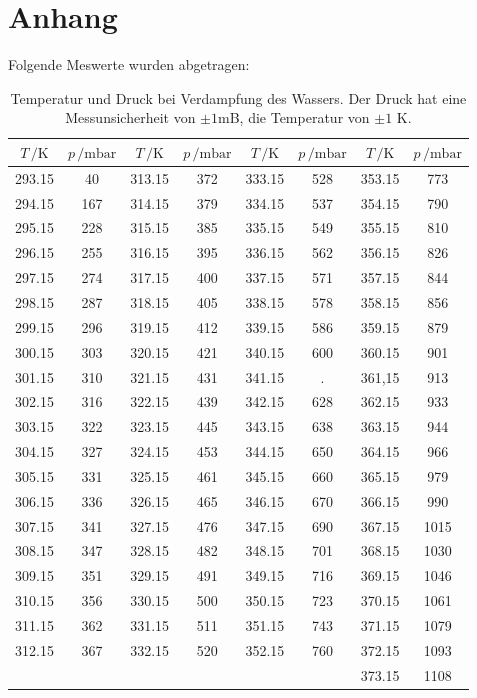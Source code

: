 \newpage
\section*{Anhang}
Folgende Meswerte wurden abgetragen:
\begin{table}[H]
    \centering
    \caption{Temperatur und Druck bei Verdampfung des Wassers. Der Druck hat eine Messunsicherheit von
    $\pm1$mB, die Temperatur von $\pm 1$ K.}
    \label{tab:Messreihe_1}
  \begin{tabular}{
    c c||c c||c c||c c
  }
  \toprule 
  $T\,/ \unit{\kelvin}$ & $p\,/ \text{mbar}$ & $T\,/ \unit{\kelvin}$ & $p\,/ \text{mbar}$&
  $T\,/ \unit{\kelvin}$ & $p\,/ \text{mbar}$ & $T\,/ \unit{\kelvin}$ & $p\,/ \text{mbar}$\\
  \midrule
  293.15  & 40   & 313.15  & 372  & 333.15  & 528  & 353.15  & 773 \\
  294.15  & 167  & 314.15  & 379  & 334.15  & 537  & 354.15  & 790 \\
  295.15  & 228  & 315.15  & 385  & 335.15  & 549  & 355.15  & 810 \\
  296.15  & 255  & 316.15  & 395  & 336.15  & 562  & 356.15  & 826 \\
  297.15  & 274  & 317.15  & 400  & 337.15  & 571  & 357.15  & 844 \\
  298.15  & 287  & 318.15  & 405  & 338.15  & 578  & 358.15  & 856 \\
  299.15  & 296  & 319.15  & 412  & 339.15  & 586  & 359.15  & 879 \\
  300.15  & 303  & 320.15  & 421  & 340.15  & 600  & 360.15  & 901 \\
  301.15  & 310  & 321.15  & 431  & 341.15  & \text{--} .& 361,15  & 913 \\
  302.15  & 316  & 322.15  & 439  & 342.15  & 628  & 362.15  & 933 \\
  303.15  & 322  & 323.15  & 445  & 343.15  & 638  & 363.15  & 944 \\
  304.15  & 327  & 324.15  & 453  & 344.15  & 650  & 364.15  & 966 \\
  305.15  & 331  & 325.15  & 461  & 345.15  & 660  & 365.15  & 979 \\
  306.15  & 336  & 326.15  & 465  & 346.15  & 670  & 366.15  & 990 \\
  307.15  & 341  & 327.15  & 476  & 347.15  & 690  & 367.15  & 1015\\
  308.15  & 347  & 328.15  & 482  & 348.15  & 701  & 368.15  & 1030\\
  309.15  & 351  & 329.15  & 491  & 349.15  & 716  & 369.15  & 1046\\
  310.15  & 356  & 330.15  & 500  & 350.15  & 723  & 370.15  & 1061\\
  311.15  & 362  & 331.15  & 511  & 351.15  & 743  & 371.15  & 1079\\
  312.15  & 367  & 332.15  & 520  & 352.15  & 760  & 372.15  & 1093\\
        &   &       &       &       &      & 373.15  & 1108 \\
  \bottomrule
  \end{tabular}
  \end{table}
